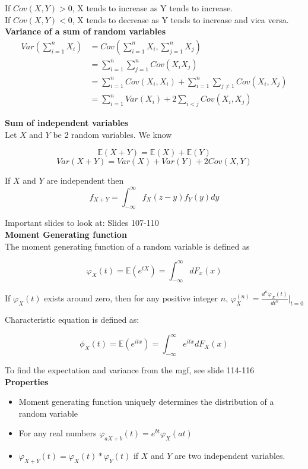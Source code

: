 If $Cov(X,Y) > 0$, X tends to increase as Y tends to increase.\\

If $Cov(X,Y) < 0$, X tends to decrease as Y tends to increase and vica versa.\\

\textbf{Variance of a sum of random variables}\\
\begin{align*}
Var(\sum_{i=1}^n X_i) &= Cov (\sum_{i=1}^n X_i, \sum_{j=1}^n X_j)\\
&= \sum_{i=1}^n \sum_{j=1}^n Cov(X_i X_j) \\
&= \sum_{i=1}^n Cov(X_i, X_i) + \sum_{i=1}^n \sum_{j \neq 1} Cov(X_i,X_j)\\
&= \sum_{i=1}^n Var(X_i) + 2 \sum_{i<j} Cov(X_i,X_j)
\end{align*}

\textbf{Sum of independent variables}\\
Let $X$ and $Y$ be 2 random variables. We know

$$\mathbb{E}(X+Y) = \mathbb{E}(X)+ \mathbb{E}(Y)$$
$$Var(X+Y) = Var(X)+Var(Y)+2Cov(X,Y)$$

If $X$ and $Y$ are independent then
$$f_{X+Y} = \int_{-\infty}^{\infty} f_X(z-y) f_Y(y) dy$$

Important slides to look at: Slides 107-110\\

\textbf{Moment Generating function}\\
The moment generating function of a random variable is defined as

$$\varphi_X(t)  = \mathbb{E}(e^{tX}) = \int_{-\infty}^{\infty} dF_x(x)$$

If $\varphi_X (t)$ exists around zero, then for any positive integer $n$, $\varphi_X^{(n)} = \frac{d^n \varphi_X(t)}{dt^n}|_{t=0}$

Characteristic equation is defined as:

$$\phi_X(t) = \mathbb{E}(e^{itx}) = \int_{-\infty}^{\infty} e^{itx} dF_X(x)$$

To find the expectation and variance from the mgf, see slide 114-116\\

\textbf{Properties}\\
\begin{itemize}
	\item Moment generating function uniquely determines the distribution of a random variable
	\item For any real numbers $\varphi_{aX+b}(t) = e^{bt} \varphi_X(at)$
	\item $\varphi_{X+Y}(t) = \varphi_X(t) * \varphi_Y(t)$ if $X$ and $Y$ are two independent variables.
\end{itemize}

